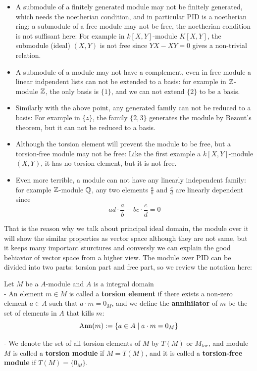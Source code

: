 \documentclass[12pt,a4paper]{article}
\begin{document}
\begin{itemize} 
    \item A submodule of a finitely generated module may not be finitely generated, which needs the noetherian condition, and in particular PID is a noetherian ring; a submodule of a free module may not be free, the noetherian condition is not suffisant here: For example in \(k[X,Y]\)-module \(K[X,Y]\), the submodule (ideal) \((X,Y)\) is not free since \(YX-XY = 0\) gives a non-trivial relation.
    \item A submodule of a module may not have a complement, even in free module a linear indpendent lists can not be extended to a basis: for example in \(\mathbb{Z}\)-module \(\mathbb{Z}\), the only basis is \(\{1\}\), and we can not extend \(\{2\}\) to be a basis.
    \item Similarly with the above point, any generated family can not be reduced to a basis: For example in \(\{z\}\), the family \(\{2,3\}\) generates the module by Bezout's theorem, but it can not be reduced to a basis.
    \item Although the torsion element will prevent the module to be free, but a torsion-free module may not be free: Like the first example a \(k[X,Y]\)-module \((X,Y)\), it has no torsion element, but it is not free.
    
    \item Even more terrible, a module can not have any linearly independent family: for example \(\mathbb{Z}\)-module \(\mathbb{Q}\), any two elements \(\frac{a}{b}\) and \(\frac{c}{d}\) are linearly dependent since \[ad \cdot \frac{a}{b} - bc \cdot \frac{c}{d} = 0\]
\end{itemize}

That is the reason why we talk about principal ideal domain, the module over it will show the similar properties as vector space although they are not same, but it keeps many important sturctures and conversly we can explain the good behiavior of vector space from a higher view. The module over PID can be divided into two parts: torsion part and free part, so we review the notation here:

\begin{definition}
    Let \(M\) be a \(A\)-module and \(A\) is a integral domain\\
    
    - An element \(m \in M\) is called a \textbf{torsion element} if there exists a non-zero element \(a \in A\) such that \(a \cdot m = 0_M\), and we define the \textbf{annihilator} of \(m\) be the set of elements in \(A\) that kills \(m\):
    \[\operatorname{Ann}(m) := \{a \in A \mid a \cdot m = 0_M\}\]

    - We denote the set of all torsion elements of \(M\) by \(T(M)\) or \(M_{tor}\), and module \(M\) is called a \textbf{torsion module} if \(M = T(M)\), and it is called a \textbf{torsion-free module} if \(T(M) = \{0_M\}\).

\end{definition}
\end{document}

